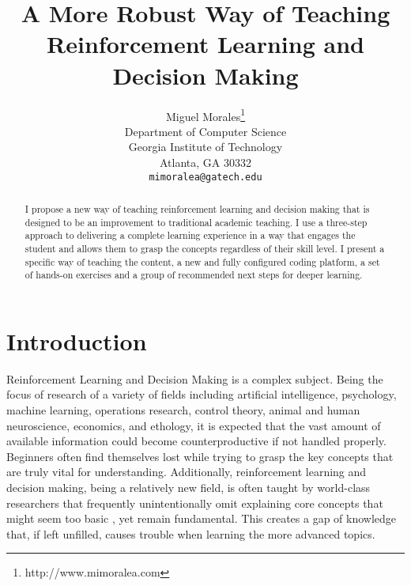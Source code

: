 \documentclass[11pt]{article} %
\title{A More Robust Way of Teaching Reinforcement Learning and Decision Making}
\author{
Miguel Morales\thanks{http://www.mimoralea.com} \\
Department of Computer Science \\
Georgia Institute of Technology \\
Atlanta, GA 30332 \\
\texttt{mimoralea@gatech.edu} \\
}
\begin{document}
\maketitle

\begin{abstract}
  I propose a new way of teaching reinforcement learning and decision making
  that is designed to be an improvement to traditional academic teaching. I use
  a three-step approach to delivering a complete learning experience in a
  way that engages the student and allows them to grasp the concepts regardless
  of their skill level. I present a specific way of teaching the content, a
  new and fully configured coding platform, a set of hands-on exercises and
  a group of recommended next steps for deeper learning.
\end{abstract}



\startmain %

\section{Introduction}

Reinforcement Learning and Decision Making is a complex subject. Being the
focus of research of a variety of fields including artificial intelligence,
psychology, machine learning, operations research, control theory, animal
and human neuroscience, economics, and ethology, it is expected that the
vast amount of available information could become counterproductive if not
handled properly. Beginners often find themselves lost while trying to grasp
the key concepts that are truly vital for understanding. Additionally, reinforcement
learning and decision making, being a relatively new field, is often taught by
world-class researchers that frequently unintentionally omit explaining
core concepts that might seem too basic \cite{gapranda}, yet remain
fundamental. This creates a gap of knowledge that, if left unfilled, causes
trouble when learning the more advanced topics.
\end{document}
